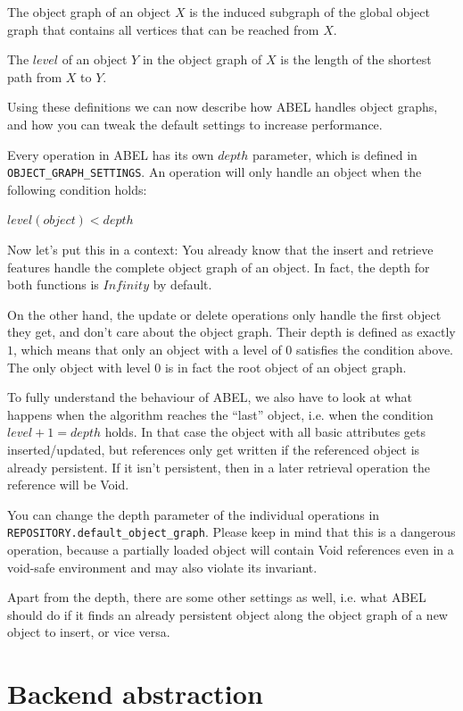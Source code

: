 \documentclass[a4paper,12pt]{report}
\begin{document}
The object graph of an object $X$ is the induced subgraph of the global object graph that contains all vertices that can be reached from $X$.

The $level$ of an object $Y$ in the object graph of $X$ is the length of the shortest path from $X$ to $Y$.

Using these definitions we can now describe how ABEL handles object graphs, and how you can tweak the default settings to increase performance.

Every operation in ABEL has its own $depth$ parameter, which is defined in \lstinline!OBJECT_GRAPH_SETTINGS!.
An operation will only handle an object when the following condition holds:

\begin{center}
 $ level(object) < depth $ 
\end{center}

Now let's put this in a context:
You already know that the insert and retrieve features handle the complete object graph of an object. 
In fact, the depth for both functions is $Infinity$ by default.

On the other hand, the update or delete operations only handle the first object they get, and don't care about the object graph.
Their depth is defined as exactly $1$, which means that only an object with a level of $0$ satisfies the condition above.
The only object with level $0$ is in fact the root object of an object graph.

To fully understand the behaviour of ABEL, we also have to look at what happens when the algorithm reaches the ``last'' object, i.e. when the condition $level + 1 = depth$ holds.
In that case the object with all basic attributes gets inserted/updated, but references only get written if the referenced object is already persistent.
If it isn't persistent, then in a later retrieval operation the reference will be Void.

You can change the depth parameter of the individual operations in \lstinline!REPOSITORY.default_object_graph!. 
Please keep in mind that this is a dangerous operation, because a partially loaded object will contain Void references even in a void-safe environment and may also violate its invariant.

Apart from the depth, there are some other settings as well, i.e. what ABEL should do if it finds an already persistent object along the object graph of a new object to insert, or vice versa.

\chapter{Backend abstraction}
\end{document}
